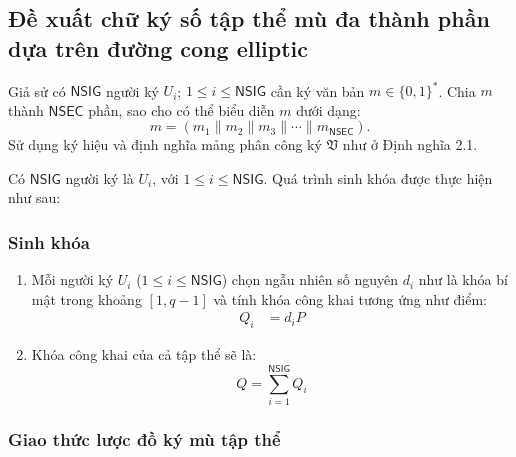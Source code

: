 \subsection{Đề xuất chữ ký số tập thể mù đa thành phần dựa trên đường cong elliptic} \label{muc.muElliptic}

Giả sử có $\mathsf{NSIG}$ người ký $U_i$; $1\leqslant i\leqslant \mathsf{NSIG}$ cần ký văn bản $m \in  \{0,1\}^*$. Chia $m$ thành $\mathsf{NSEC}$ phần, sao cho có thể biểu diễn $m$ dưới dạng: \[ m= (m_1\parallel m_2\parallel m_3 \parallel \dotsm \parallel m_\mathsf{NSEC} ). \] Sử dụng ký hiệu và định nghĩa mảng phân công ký $\mathfrak{V}$ như ở Định nghĩa 2.1.

Có $\mathsf{NSIG}$ người ký là $U_i$, với $1 \le i \le \mathsf{NSIG}$. Quá trình sinh khóa được thực hiện như sau:
\subsubsection{Sinh khóa}
\begin{enumerate}[label=(\arabic*)]
	\item Mỗi người ký $U_i$ ($1\leqslant i\leqslant \mathsf{NSIG}$) chọn ngẫu nhiên số nguyên $d_i$ như là khóa bí mật trong khoảng $[1,q-1]$ và tính khóa công khai tương ứng như điểm:
	\begin{align*}
		Q_i &=d_iP %
	\end{align*}		
	\item Khóa công khai của cả tập thể sẽ là:
	\[ Q = \sum_{i=1}^{\mathsf{NSIG}}Q_i \]
\end{enumerate}

\subsubsection{Giao thức lược đồ ký mù tập thể}

